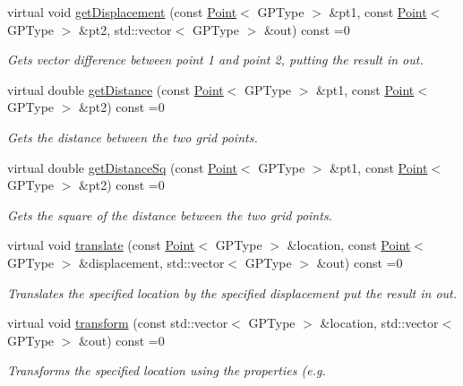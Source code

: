 \begin{DoxyCompactItemize}
virtual void \hyperlink{classrepast_1_1_grid_a23236c2387ba343121dbf71901dbb341}{get\-Displacement} (const \hyperlink{classrepast_1_1_point}{Point}$<$ G\-P\-Type $>$ \&pt1, const \hyperlink{classrepast_1_1_point}{Point}$<$ G\-P\-Type $>$ \&pt2, std\-::vector$<$ G\-P\-Type $>$ \&out) const =0
\begin{DoxyCompactList}\small\item\em Gets vector difference between point 1 and point 2, putting the result in out. \end{DoxyCompactList}\item 
virtual double \hyperlink{classrepast_1_1_grid_a27213b5f9decf10e1c99a5a7b4ae387a}{get\-Distance} (const \hyperlink{classrepast_1_1_point}{Point}$<$ G\-P\-Type $>$ \&pt1, const \hyperlink{classrepast_1_1_point}{Point}$<$ G\-P\-Type $>$ \&pt2) const =0
\begin{DoxyCompactList}\small\item\em Gets the distance between the two grid points. \end{DoxyCompactList}\item 
virtual double \hyperlink{classrepast_1_1_grid_a456d00d28995a48b41b8f6c84817879e}{get\-Distance\-Sq} (const \hyperlink{classrepast_1_1_point}{Point}$<$ G\-P\-Type $>$ \&pt1, const \hyperlink{classrepast_1_1_point}{Point}$<$ G\-P\-Type $>$ \&pt2) const =0
\begin{DoxyCompactList}\small\item\em Gets the square of the distance between the two grid points. \end{DoxyCompactList}\item 
virtual void \hyperlink{classrepast_1_1_grid_a5aa30c315b9a32830b804d2e49af14d0}{translate} (const \hyperlink{classrepast_1_1_point}{Point}$<$ G\-P\-Type $>$ \&location, const \hyperlink{classrepast_1_1_point}{Point}$<$ G\-P\-Type $>$ \&displacement, std\-::vector$<$ G\-P\-Type $>$ \&out) const =0
\begin{DoxyCompactList}\small\item\em Translates the specified location by the specified displacement put the result in out. \end{DoxyCompactList}\item 
virtual void \hyperlink{classrepast_1_1_grid_a001bf75cd2e436112555a5f992d1d372}{transform} (const std\-::vector$<$ G\-P\-Type $>$ \&location, std\-::vector$<$ G\-P\-Type $>$ \&out) const =0
\begin{DoxyCompactList}\small\item\em Transforms the specified location using the properties (e.\-g. \end{DoxyCompactList}\item 

\end{DoxyCompactItemize}
